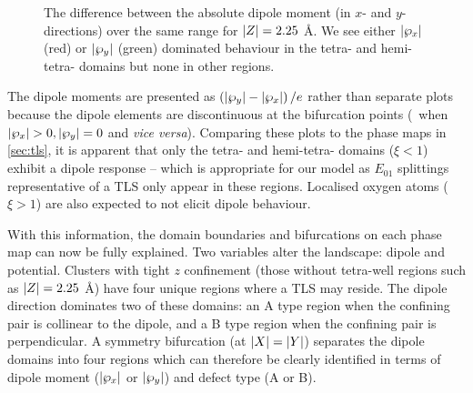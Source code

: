 \begin{figure}[htp]
  \caption[fig14]{\label{fig:dipole225}The difference between the absolute dipole moment (in $x$- and $y$-directions) over the same range for $\lvert Z\rvert = 2.25$ \AA. We see either $\lvert\wp_x\rvert$ (red) or $\lvert\wp_y\rvert$ (green) dominated behaviour in the tetra- and hemi-tetra- domains but none in other regions.}
\end{figure}

The dipole moments are presented as $\left(\lvert\wp_y\rvert-\lvert\wp_x\rvert\right)/e$ rather than separate plots because the dipole elements are discontinuous at the bifurcation points (\ie\ when $\lvert\wp_x\rvert>0, \lvert\wp_y\rvert=0$ and \textit{vice versa}).
Comparing these plots to the phase maps in \cref{sec:tls}, it is apparent that only the tetra- and hemi-tetra- domains ($\xi < 1$) exhibit a dipole response -- which is appropriate for our model as $E_{01}$ splittings representative of a TLS only appear in these regions.
Localised oxygen atoms ($\xi > 1$) are also expected to not elicit dipole behaviour.

With this information, the domain boundaries and bifurcations on each phase map can now be fully explained.
Two variables alter the landscape: dipole and potential.
Clusters with tight $z$ confinement (those without tetra-well regions such as $\lvert Z\rvert = 2.25$ \AA) have four unique regions where a TLS may reside.
The dipole direction dominates two of these domains: an A type region when the confining pair is collinear to the dipole, and a B type region when the confining pair is perpendicular.
A symmetry bifurcation (at $\lvert X\rvert = \lvert Y\rvert$) separates the dipole domains into four regions which can therefore be clearly identified in terms of dipole moment ($\lvert\wp_x\rvert$ or $\lvert\wp_y\rvert$) and defect type (A or B).

